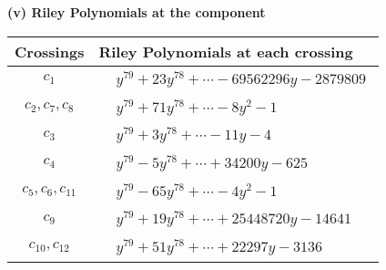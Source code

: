 \documentclass[1p]{elsarticle_modified}
\theoremstyle{definition}
\begin{document}
\newpage\renewcommand{\arraystretch}{1}
\flushleft \textbf{(v) Riley Polynomials at the component}\newline \\
\begin{tabular}{m{50pt}|m{274pt}}
Crossings & \hspace{64pt}Riley Polynomials at each crossing \\
\hline $$\begin{aligned}c_{1}\end{aligned}$$&$\begin{aligned}
&y^{79}+23 y^{78}+\cdots-69562296 y-2879809
\end{aligned}$\\
\hline $$\begin{aligned}c_{2},c_{7},c_{8}\end{aligned}$$&$\begin{aligned}
&y^{79}+71 y^{78}+\cdots-8 y^2-1
\end{aligned}$\\
\hline $$\begin{aligned}c_{3}\end{aligned}$$&$\begin{aligned}
&y^{79}+3 y^{78}+\cdots-11 y-4
\end{aligned}$\\
\hline $$\begin{aligned}c_{4}\end{aligned}$$&$\begin{aligned}
&y^{79}-5 y^{78}+\cdots+34200 y-625
\end{aligned}$\\
\hline $$\begin{aligned}c_{5},c_{6},c_{11}\end{aligned}$$&$\begin{aligned}
&y^{79}-65 y^{78}+\cdots-4 y^2-1
\end{aligned}$\\
\hline $$\begin{aligned}c_{9}\end{aligned}$$&$\begin{aligned}
&y^{79}+19 y^{78}+\cdots+25448720 y-14641
\end{aligned}$\\
\hline $$\begin{aligned}c_{10},c_{12}\end{aligned}$$&$\begin{aligned}
&y^{79}+51 y^{78}+\cdots+22297 y-3136
\end{aligned}$\\
\hline
\end{tabular}\\~\\
\end{document}
